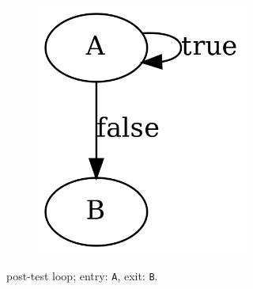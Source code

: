\begin{savenotes}
\begin{figure}[htbp]
\begin{subfigure}[ht]{0.30\textwidth}
\begin{subfigure}[ht]{0.35\textwidth}
				\includegraphics[width=\textwidth]{inc/primitives/post_loop.png}
			\end{subfigure}
			\caption{post-test loop; entry: \texttt{A}, exit: \texttt{B}.}
			\label{fig:post_loop_graph_representation}
		\end{subfigure}
		\qquad
		\begin{subfigure}[ht]{0.24\textwidth}
			\centering
			\begin{subfigure}[ht]{0.20\textwidth}
				
			\end{subfigure}
			\begin{subfigure}[ht]{0.35\textwidth}

\end{subfigure}
\end{subfigure}
\end{figure}
\end{savenotes}
